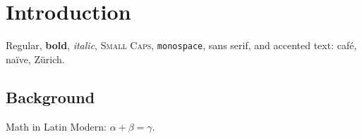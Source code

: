 \documentclass{report}
\begin{document}
\chapter{Introduction}
Regular, \textbf{bold}, \textit{italic}, \textsc{Small Caps}, \texttt{monospace},
\textsf{sans serif}, and accented text: café, naïve, Zürich.
\onehalfspacing
\section{Background}
Math in Latin Modern: $\alpha + \beta = \gamma$.
\end{document}

